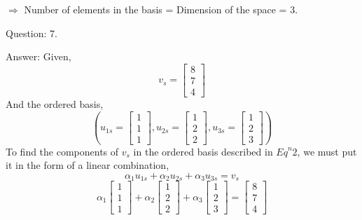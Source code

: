 \documentclass[a4paper]{article}
\begin{document}
\begin{qalist}
			$\Rightarrow$ Number of elements in the basis = Dimension of the space = 3.
			
		\item[Question: 7.] \setcounter{equation}{0} %
		\item[Answer:]
			Given, 
			\begin{equation}{v}_{s} = \begin{bmatrix}8 \\ 7 \\ 4\end{bmatrix}\end{equation}
			And the ordered basis,
			\begin{equation}
				\left(
					{u}_{1s} = \begin{bmatrix}1 \\ 1 \\ 1\end{bmatrix},
					{u}_{2s} = \begin{bmatrix}1 \\ 2 \\ 2\end{bmatrix},
					{u}_{3s} = \begin{bmatrix}1 \\ 2 \\ 3\end{bmatrix}
				\right)
			\end{equation}
			To find the components of ${v}_{s}$ in the ordered basis described in ${Eq}^{n} 2$, we must put it in the form of a linear combination, 
			\begin{equation}
				{\alpha}_{1}{u}_{1s} + {\alpha}_{2}{u}_{2s} + {\alpha}_{3}{u}_{3s} = {v}_{s}
			\end{equation}
			\begin{equation}
				{\alpha}_{1}\begin{bmatrix}1 \\ 1 \\ 1\end{bmatrix} + {\alpha}_{2}\begin{bmatrix}1 \\ 2 \\ 2\end{bmatrix} + {\alpha}_{3}\begin{bmatrix}1 \\ 2 \\ 3\end{bmatrix} = \begin{bmatrix}8 \\ 7 \\ 4\end{bmatrix}

\end{equation}
\end{qalist}
\end{document}
